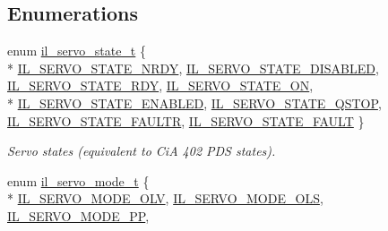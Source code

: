 \subsection*{Enumerations}
\begin{DoxyCompactItemize}
\item 
enum \hyperlink{group__IL__SERVO_ga34dfa4c089ba4ee833652ac6c40acd0d}{il\+\_\+servo\+\_\+state\+\_\+t} \{ \\*
\hyperlink{group__IL__SERVO_gga34dfa4c089ba4ee833652ac6c40acd0daa55953b65ace09c3bed52d4114840f1b}{I\+L\+\_\+\+S\+E\+R\+V\+O\+\_\+\+S\+T\+A\+T\+E\+\_\+\+N\+R\+DY}, 
\hyperlink{group__IL__SERVO_gga34dfa4c089ba4ee833652ac6c40acd0da23788d6ca281a3fbfed7562d75667adb}{I\+L\+\_\+\+S\+E\+R\+V\+O\+\_\+\+S\+T\+A\+T\+E\+\_\+\+D\+I\+S\+A\+B\+L\+ED}, 
\hyperlink{group__IL__SERVO_gga34dfa4c089ba4ee833652ac6c40acd0da526abc40393aee63a777f94b1a50f111}{I\+L\+\_\+\+S\+E\+R\+V\+O\+\_\+\+S\+T\+A\+T\+E\+\_\+\+R\+DY}, 
\hyperlink{group__IL__SERVO_gga34dfa4c089ba4ee833652ac6c40acd0da7cb1afaed87d34d110581a9e89509fdf}{I\+L\+\_\+\+S\+E\+R\+V\+O\+\_\+\+S\+T\+A\+T\+E\+\_\+\+ON}, 
\\*
\hyperlink{group__IL__SERVO_gga34dfa4c089ba4ee833652ac6c40acd0dab2f6b57025214e40be9fc2e1d69de2a5}{I\+L\+\_\+\+S\+E\+R\+V\+O\+\_\+\+S\+T\+A\+T\+E\+\_\+\+E\+N\+A\+B\+L\+ED}, 
\hyperlink{group__IL__SERVO_gga34dfa4c089ba4ee833652ac6c40acd0da3710762734b06272b18529e200585583}{I\+L\+\_\+\+S\+E\+R\+V\+O\+\_\+\+S\+T\+A\+T\+E\+\_\+\+Q\+S\+T\+OP}, 
\hyperlink{group__IL__SERVO_gga34dfa4c089ba4ee833652ac6c40acd0daf1d3fe0fefb6aecadacee5fb599375c0}{I\+L\+\_\+\+S\+E\+R\+V\+O\+\_\+\+S\+T\+A\+T\+E\+\_\+\+F\+A\+U\+L\+TR}, 
\hyperlink{group__IL__SERVO_gga34dfa4c089ba4ee833652ac6c40acd0da0e2beb3184098ba502e34354910f63f2}{I\+L\+\_\+\+S\+E\+R\+V\+O\+\_\+\+S\+T\+A\+T\+E\+\_\+\+F\+A\+U\+LT}
 \}\begin{DoxyCompactList}\small\item\em Servo states (equivalent to CiA 402 P\+DS states). \end{DoxyCompactList}
\item 
enum \hyperlink{group__IL__SERVO_ga6b3323798a8f235c225cc1d0cd27840a}{il\+\_\+servo\+\_\+mode\+\_\+t} \{ \\*
\hyperlink{group__IL__SERVO_gga6b3323798a8f235c225cc1d0cd27840aad8133deaaf79c917b29d388cf921a651}{I\+L\+\_\+\+S\+E\+R\+V\+O\+\_\+\+M\+O\+D\+E\+\_\+\+O\+LV}, 
\hyperlink{group__IL__SERVO_gga6b3323798a8f235c225cc1d0cd27840aaf49b82b9a802bb2b87cca3c777e8a72c}{I\+L\+\_\+\+S\+E\+R\+V\+O\+\_\+\+M\+O\+D\+E\+\_\+\+O\+LS}, 
\hyperlink{group__IL__SERVO_gga6b3323798a8f235c225cc1d0cd27840aa84502500bb9e2800c8c3bad60f30afd0}{I\+L\+\_\+\+S\+E\+R\+V\+O\+\_\+\+M\+O\+D\+E\+\_\+\+PP}, 

\end{DoxyCompactItemize}
